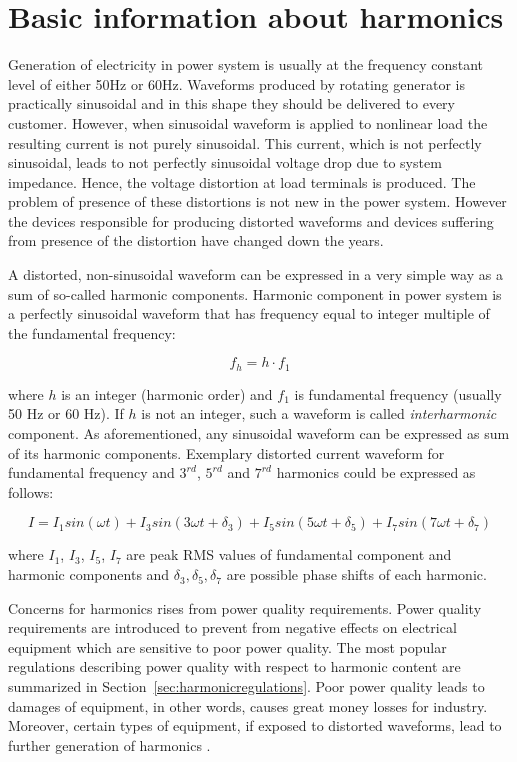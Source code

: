 \documentclass[12pt]{report} %
\begin{document}
\section{Basic information about harmonics}
Generation of electricity in power system is usually at the frequency constant level of either 50Hz or 60Hz. Waveforms produced by rotating generator is practically sinusoidal and in this shape they should be delivered to every customer. However, when sinusoidal waveform is applied to nonlinear load the resulting current is not purely sinusoidal. This current, which is not perfectly sinusoidal, leads to not perfectly sinusoidal voltage drop due to system impedance. Hence, the voltage distortion at load terminals is produced. The problem of presence of these distortions is not new in the power system. However the devices responsible for producing distorted waveforms and devices suffering from presence of the distortion have changed down the years.

A distorted, non-sinusoidal waveform can be expressed in a very simple way as a sum of so-called harmonic components. Harmonic component in power system is a perfectly sinusoidal waveform that has frequency equal to integer multiple of the fundamental frequency:

\begin{equation} 
 	f_h=h\cdot f_1
\end{equation}

where $h$ is an integer (harmonic order) and $f_1$ is fundamental frequency (usually 50 Hz or 60 Hz). If $h$ is not an integer, such a waveform is called \textit{interharmonic} component.
As aforementioned, any sinusoidal waveform can be expressed as sum of its harmonic components. Exemplary distorted current waveform for fundamental frequency and $3^{rd}$, $5^{rd}$ and $7^{rd}$ harmonics could be expressed as follows:

\begin{equation} 
	I=I_1  sin(\omega t)+I_3  sin(3\omega t+\delta_3 )+I_5  sin(5\omega t+\delta_5 )+I_7  sin(7\omega t+\delta_7 )
\end{equation}

where $I_1$, $I_3$, $I_5$, $I_7$ are peak RMS values of fundamental component and harmonic components and $\delta_3 ,\delta_5 ,\delta_7$ are possible phase shifts of each harmonic.

Concerns for harmonics rises from power quality requirements. Power quality requirements are introduced to prevent from negative effects on electrical equipment which are sensitive to poor power quality. The most popular regulations describing power quality with respect to harmonic content are summarized in Section~\ref{sec:harmonicregulations}. Poor power quality leads to damages of equipment, in other words, causes great money losses for industry. Moreover, certain types of equipment, if exposed to distorted waveforms, lead to further generation of harmonics \cite{das}.
\end{document}
